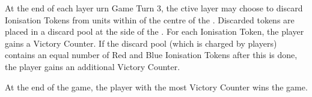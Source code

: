 At the end of each layer urn Game Turn 3, the ctive layer may choose to discard Ionisation Tokens from units within  of the centre of the . Discarded tokens are placed in a discard pool at the side of the . For each  Ionisation Token, the player gains a Victory Counter. If the discard pool (which is charged by  players) contains an equal number of Red and Blue Ionisation Tokens after this is done, the player gains an additional Victory Counter.

At the end of the game, the player with the most Victory Counter wins the game.
